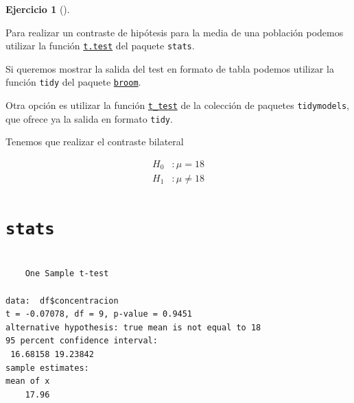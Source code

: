 \documentclass[
  a4paper,
]{scrreport}
\newenvironment{Shaded}{\begin{snugshade}}{\end{snugshade}}
\newcommand{\AttributeTok}[1]{\textcolor[rgb]{0.40,0.45,0.13}{#1}}
\newcommand{\DecValTok}[1]{\textcolor[rgb]{0.68,0.00,0.00}{#1}}
\newcommand{\FunctionTok}[1]{\textcolor[rgb]{0.28,0.35,0.67}{#1}}
\newcommand{\NormalTok}[1]{\textcolor[rgb]{0.00,0.23,0.31}{#1}}
\newcommand{\SpecialCharTok}[1]{\textcolor[rgb]{0.37,0.37,0.37}{#1}}
\theoremstyle{definition}
\newtheorem{exercise}{Ejercicio}[chapter]
\theoremstyle{remark}
\begin{document}
\begin{exercise}[]
\begin{enumerate}
\begin{tcolorbox}
  Para realizar un contraste de hipótesis para la media de una población
  podemos utilizar la función
  \href{https://www.rdocumentation.org/packages/stats/versions/3.6.2/topics/t.test}{\texttt{t.test}}
  del paquete \texttt{stats}.

  Si queremos mostrar la salida del test en formato de tabla podemos
  utilizar la función \texttt{tidy} del paquete
  \href{https://broom.tidymodels.org/index.html}{\texttt{broom}}.

  Otra opción es utilizar la función
  \href{https://infer.tidymodels.org/reference/t_test.html}{\texttt{t\_test}}
  de la colección de paquetes \texttt{tidymodels}, que ofrece ya la
  salida en formato \texttt{tidy}.

  \end{tcolorbox}

  \begin{tcolorbox}[enhanced jigsaw, coltitle=black, left=2mm, colback=white, leftrule=.75mm, toptitle=1mm, breakable, bottomrule=.15mm, titlerule=0mm, bottomtitle=1mm, title=\textcolor{quarto-callout-tip-color}{\faLightbulb}\hspace{0.5em}{Solución}, arc=.35mm, toprule=.15mm, rightrule=.15mm, colframe=quarto-callout-tip-color-frame, opacityback=0, colbacktitle=quarto-callout-tip-color!10!white, opacitybacktitle=0.6]

  Tenemos que realizar el contraste bilateral

  \begin{align*}
  H_0 &: \mu=18\\
  H_1 &: \mu\neq 18 
  \end{align*}

  \section{\texorpdfstring{\texttt{stats}}{stats}}

\begin{Shaded}
\end{Shaded}

\begin{verbatim}

    One Sample t-test

data:  df$concentracion
t = -0.07078, df = 9, p-value = 0.9451
alternative hypothesis: true mean is not equal to 18
95 percent confidence interval:
 16.68158 19.23842
sample estimates:
mean of x 
    17.96 
\end{verbatim}


\end{tcolorbox}
\end{enumerate}
\end{exercise}
\end{document}

